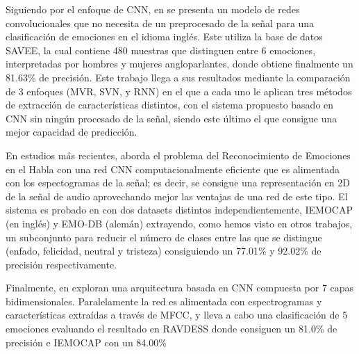 \documentclass[11pt,a4paper,spanish]{book}
\begin{document}
	 Siguiendo por el enfoque de CNN, en \cite{AbdulQayyum2019} se presenta un modelo de redes convolucionales que no necesita de un preprocesado de la señal para una clasificación de emociones en el idioma inglés. Este utiliza la base de datos SAVEE, la cual contiene 480 muestras que distinguen entre 6 emociones, interpretadas por hombres y mujeres angloparlantes, donde obtiene finalmente un 81.63\% de precisión. Este trabajo llega a sus resultados mediante la comparación de 3 enfoques (MVR, SVN, y RNN) en el que a cada uno le aplican tres métodos de extracción de características distintos, con el sistema propuesto basado en CNN sin ningún procesado de la señal, siendo este último el que consigue una mejor capacidad de predicción.
	
	En estudios más recientes, \cite{Anvarjon2020} aborda el problema del Reconocimiento de Emociones en el Habla con una red CNN computacionalmente eficiente que es alimentada con los espectogramas de la señal; es decir, se consigue una representación en 2D de la señal de audio aprovechando mejor las ventajas de una red de este tipo. El sistema es probado en con dos datasets distintos independientemente, IEMOCAP (en inglés) y EMO-DB (alemán) extrayendo, como hemos visto en otros trabajos, un subconjunto para reducir el número de clases entre las que se distingue (enfado, felicidad, neutral y tristeza) consiguiendo un 77.01\% y 92.02\%  de precisión respectivamente.

	
	 Finalmente, en \cite{Mustaqeem2020} exploran una arquitectura basada en CNN compuesta por 7 capas bidimensionales. Paralelamente la red es alimentada con espectrogramas y características extraídas a través de MFCC, y lleva a cabo una clasificación de 5 emociones evaluando el resultado en RAVDESS donde consiguen un 81.0\% de precisión e IEMOCAP con un 84.00\%
	
\end{document}
